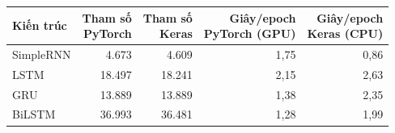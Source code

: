 \begin{tabular}{lrrrr}
\toprule
Kiến trúc & \makecell[r]{Tham số\\PyTorch} & \makecell[r]{Tham số\\Keras} & \makecell[r]{Giây/epoch\\PyTorch (GPU)} & \makecell[r]{Giây/epoch\\Keras (CPU)} \\
\midrule
SimpleRNN & 4{.}673 & 4{.}609 & 1{,}75 & 0{,}86 \\
LSTM & 18{.}497 & 18{.}241 & 2{,}15 & 2{,}63 \\
GRU & 13{.}889 & 13{.}889 & 1{,}38 & 2{,}35 \\
BiLSTM & 36{.}993 & 36{.}481 & 1{,}28 & 1{,}99 \\
\bottomrule
\end{tabular}
